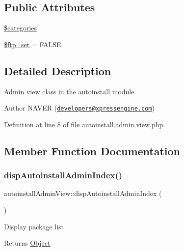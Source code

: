 \subsection*{Public Attributes}
\begin{DoxyCompactItemize}
\item 
\hyperlink{classautoinstallAdminView_aa2f6b16960f2a51acaf622480024e2a4}{\$categories}
\item 
\hyperlink{classautoinstallAdminView_a2b4389cba13f2fc27c57adb8b597a56f}{\$ftp\+\_\+set} = F\+A\+L\+SE
\end{DoxyCompactItemize}


\subsection{Detailed Description}
Admin view class in the autoinstall module \begin{DoxyAuthor}{Author}
N\+A\+V\+ER (\href{mailto:developers@xpressengine.com}{\tt developers@xpressengine.\+com}) 
\end{DoxyAuthor}


Definition at line 8 of file autoinstall.\+admin.\+view.\+php.



\subsection{Member Function Documentation}
\hypertarget{classautoinstallAdminView_af3c3bcabc77b8e0d812db60bfc8bc621}{}\label{classautoinstallAdminView_af3c3bcabc77b8e0d812db60bfc8bc621} 
\subsubsection{\texorpdfstring{disp\+Autoinstall\+Admin\+Index()}{dispAutoinstallAdminIndex()}}
{\footnotesize\ttfamily autoinstall\+Admin\+View\+::disp\+Autoinstall\+Admin\+Index (\begin{DoxyParamCaption}{ }\end{DoxyParamCaption})}

Display package list

\begin{DoxyReturn}{Returns}
\hyperlink{classObject}{Object} 
\end{DoxyReturn}


